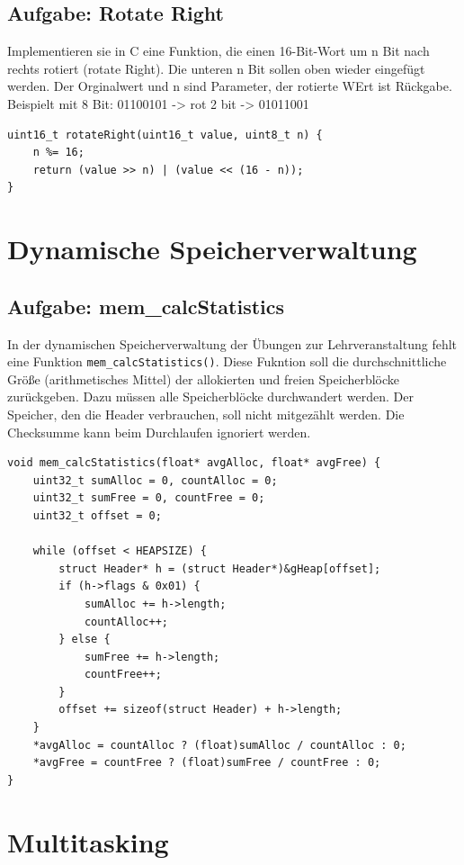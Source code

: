 \documentclass[12pt,a4paper]{article}
\begin{document}
\subsection{Aufgabe: Rotate Right}
Implementieren sie in C eine Funktion, die einen 16-Bit-Wort um n Bit nach rechts rotiert (rotate Right). Die unteren n Bit sollen oben wieder eingefügt werden.
Der Orginalwert und n sind Parameter, der rotierte WErt ist Rückgabe.
Beispielt mit 8 Bit: 01100101 -> rot 2 bit -> 01011001
\begin{lstlisting}
uint16_t rotateRight(uint16_t value, uint8_t n) {
    n %= 16;
    return (value >> n) | (value << (16 - n));
}
\end{lstlisting}

\newpage
\section{Dynamische Speicherverwaltung}

\subsection{Aufgabe: mem\_calcStatistics}
In der dynamischen Speicherverwaltung der Übungen zur Lehrveranstaltung fehlt eine Funktion \texttt{mem\_calcStatistics()}. Diese Fukntion soll die durchschnittliche Größe
(arithmetisches Mittel) der allokierten und freien Speicherblöcke zurückgeben. Dazu müssen alle Speicherblöcke durchwandert werden. Der Speicher, den die Header verbrauchen, soll
nicht mitgezählt werden. Die Checksumme kann beim Durchlaufen ignoriert werden.
\begin{lstlisting}
void mem_calcStatistics(float* avgAlloc, float* avgFree) {
    uint32_t sumAlloc = 0, countAlloc = 0;
    uint32_t sumFree = 0, countFree = 0;
    uint32_t offset = 0;

    while (offset < HEAPSIZE) {
        struct Header* h = (struct Header*)&gHeap[offset];
        if (h->flags & 0x01) {
            sumAlloc += h->length;
            countAlloc++;
        } else {
            sumFree += h->length;
            countFree++;
        }
        offset += sizeof(struct Header) + h->length;
    }
    *avgAlloc = countAlloc ? (float)sumAlloc / countAlloc : 0;
    *avgFree = countFree ? (float)sumFree / countFree : 0;
}
\end{lstlisting}

\newpage
\section{Multitasking}
\end{document}
